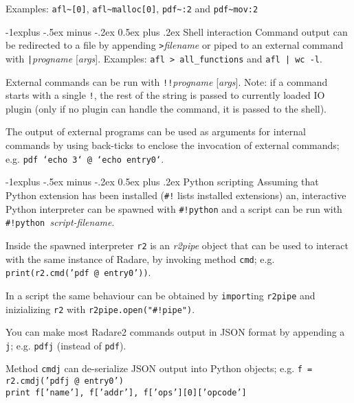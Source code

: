 \documentclass[a4paper,landscape]{article}
\makeatletter
\renewcommand{\subsection}{\@startsection{subsection}{2}{0mm}%
                                {-1explus -.5ex minus -.2ex}%
                                {0.5ex plus .2ex}%
                                {\normalfont\normalsize\bfseries}}
\makeatother
\begin{document}
\begin{multicols*}{3}
Examples: \texttt{afl\textasciitilde{}[0]}, \texttt{afl\textasciitilde{}malloc[0]}, \texttt{pdf\textasciitilde{}:2} and \texttt{pdf\textasciitilde{}mov:2}

\subsection{Shell interaction}
Command output can be redirected to a file by appending \texttt{>}\textit{filename}
or piped to an external command with \texttt{|}\textit{progname} [\textit{args}].
Examples: \texttt{afl > all\_functions} and \texttt{afl | wc -l}.

External commands can be run with \texttt{!!}\textit{progname} [\textit{args}].
Note: if a command starts with a single \texttt{!}, the rest of the string is passed to currently loaded IO plugin (only if no plugin can handle the command, it is passed to the shell).

The output of external programs can be used as arguments for internal commands by using back-ticks to enclose the invocation of external commands; e.g. \texttt{pdf `echo 3` @ `echo entry0`}.

\subsection{Python scripting}
Assuming that Python extension has been installed (\texttt{\#!} lists installed extensions)
an, interactive Python interpreter can be spawned with \texttt{\#!python} and a script can
be run with \texttt{\#!python }\textit{script-filename}.

Inside the spawned interpreter \texttt{r2} is an \emph{r2pipe} object that can be used to interact with
the same instance of Radare, by invoking method \texttt{cmd}; e.g. \texttt{print(r2.cmd('pdf @ entry0'))}.

In a script the same behaviour can be obtained by \texttt{import}ing \texttt{r2pipe} and inizializing \texttt{r2} with \texttt{r2pipe.open("\#!pipe")}.

You can make most Radare2 commands output in JSON format by appending a \texttt{j}; e.g. \texttt{pdfj} (instead of \texttt{pdf}).

Method \texttt{cmdj} can de-serialize JSON output into Python objects; e.g. \texttt{f = r2.cmdj('pdfj @ entry0')} \\ \texttt{print f['name'], f['addr'], f['ops'][0]['opcode']}


\end{multicols*}
\end{document}
